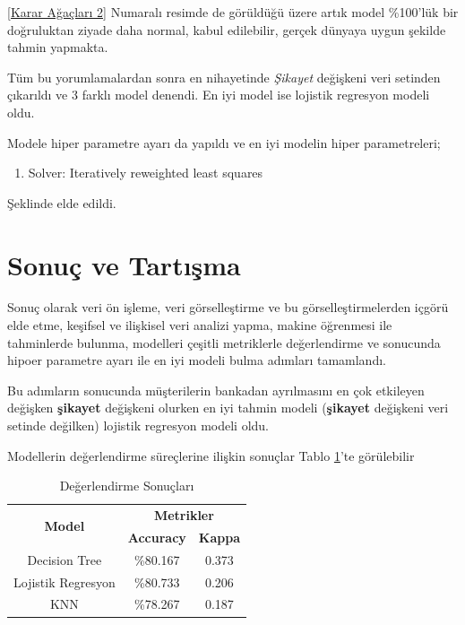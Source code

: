 \documentclass{article}
\begin{document}
\ref{Karar Ağaçları 2} Numaralı resimde de görüldüğü üzere artık model \%100'lük bir doğruluktan ziyade daha normal, kabul edilebilir, gerçek dünyaya uygun şekilde tahmin yapmakta.

Tüm bu yorumlamalardan sonra en nihayetinde \textit{Şikayet} değişkeni veri setinden çıkarıldı ve 3 farklı model denendi. En iyi model ise lojistik regresyon modeli oldu.

Modele hiper parametre ayarı da yapıldı ve en iyi modelin hiper parametreleri;
\begin{enumerate}
    \item Solver: Iteratively reweighted least squares 
\end{enumerate}
Şeklinde elde edildi.

\clearpage
\section{Sonuç ve Tartışma}
Sonuç olarak veri ön işleme, veri görselleştirme ve bu görselleştirmelerden içgörü elde etme, keşifsel ve ilişkisel veri analizi yapma, makine öğrenmesi ile tahminlerde bulunma, modelleri çeşitli metriklerle değerlendirme ve sonucunda hipoer parametre ayarı ile en iyi modeli bulma adımları tamamlandı.

Bu adımların sonucunda müşterilerin bankadan ayrılmasını en çok etkileyen değişken \textbf{şikayet} değişkeni olurken en iyi tahmin modeli (\textbf{şikayet} değişkeni veri setinde değilken) lojistik regresyon modeli oldu.

Modellerin değerlendirme süreçlerine ilişkin sonuçlar Tablo \ref{tab:acc}'te görülebilir

\vspace{10pt}
\begin{table}[h]
    \centering
    \caption{Değerlendirme Sonuçları}
    \begin{tabular}{|c|c|c|}
         \hline
         \multirow{2}{*}{\textbf{Model}} & \multicolumn{2}{c|}{\textbf{Metrikler}} \\
         \cline{2-3}
         & \textbf{Accuracy} & \textbf{Kappa} \\
         \hline
         Decision Tree & \%80.167 & 0.373 \\
         Lojistik Regresyon & \%80.733 & 0.206 \\
         KNN & \%78.267 & 0.187 \\
         \hline
    \end{tabular}
    \label{tab:acc}
\end{table}
\end{document}
